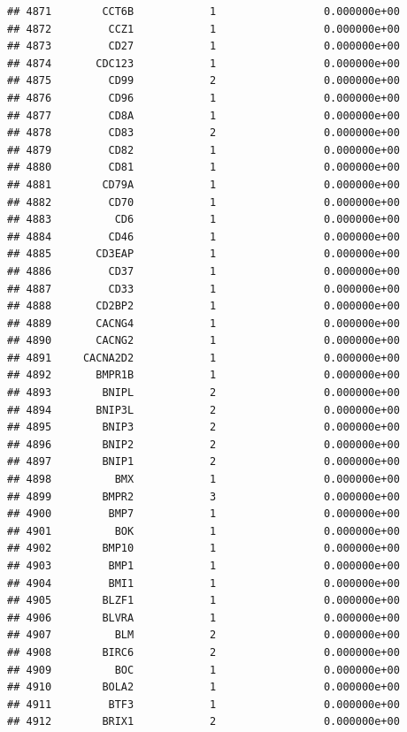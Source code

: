 \documentclass[
]{article}
\begin{document}
\begin{verbatim}
## 4871        CCT6B            1                 0.000000e+00
## 4872         CCZ1            1                 0.000000e+00
## 4873         CD27            1                 0.000000e+00
## 4874       CDC123            1                 0.000000e+00
## 4875         CD99            2                 0.000000e+00
## 4876         CD96            1                 0.000000e+00
## 4877         CD8A            1                 0.000000e+00
## 4878         CD83            2                 0.000000e+00
## 4879         CD82            1                 0.000000e+00
## 4880         CD81            1                 0.000000e+00
## 4881        CD79A            1                 0.000000e+00
## 4882         CD70            1                 0.000000e+00
## 4883          CD6            1                 0.000000e+00
## 4884         CD46            1                 0.000000e+00
## 4885       CD3EAP            1                 0.000000e+00
## 4886         CD37            1                 0.000000e+00
## 4887         CD33            1                 0.000000e+00
## 4888       CD2BP2            1                 0.000000e+00
## 4889       CACNG4            1                 0.000000e+00
## 4890       CACNG2            1                 0.000000e+00
## 4891     CACNA2D2            1                 0.000000e+00
## 4892       BMPR1B            1                 0.000000e+00
## 4893        BNIPL            2                 0.000000e+00
## 4894       BNIP3L            2                 0.000000e+00
## 4895        BNIP3            2                 0.000000e+00
## 4896        BNIP2            2                 0.000000e+00
## 4897        BNIP1            2                 0.000000e+00
## 4898          BMX            1                 0.000000e+00
## 4899        BMPR2            3                 0.000000e+00
## 4900         BMP7            1                 0.000000e+00
## 4901          BOK            1                 0.000000e+00
## 4902        BMP10            1                 0.000000e+00
## 4903         BMP1            1                 0.000000e+00
## 4904         BMI1            1                 0.000000e+00
## 4905        BLZF1            1                 0.000000e+00
## 4906        BLVRA            1                 0.000000e+00
## 4907          BLM            2                 0.000000e+00
## 4908        BIRC6            2                 0.000000e+00
## 4909          BOC            1                 0.000000e+00
## 4910        BOLA2            1                 0.000000e+00
## 4911         BTF3            1                 0.000000e+00
## 4912        BRIX1            2                 0.000000e+00

\end{verbatim}
\end{document}

